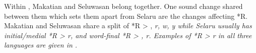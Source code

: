 
Within , Makatian
and Seluwasan belong together.
One sound change shared between them which sets them apart from
Selaru are the changes affecting *R.
Makatian and Seluwasan share a split of *R > {\0}, \it{r, w, y}
while Selaru usually has initial/medial *R > \it{r},
and word-final *R > {\0}, \it{r}.
Examples of *R > \it{r} in all three languages are given in .

